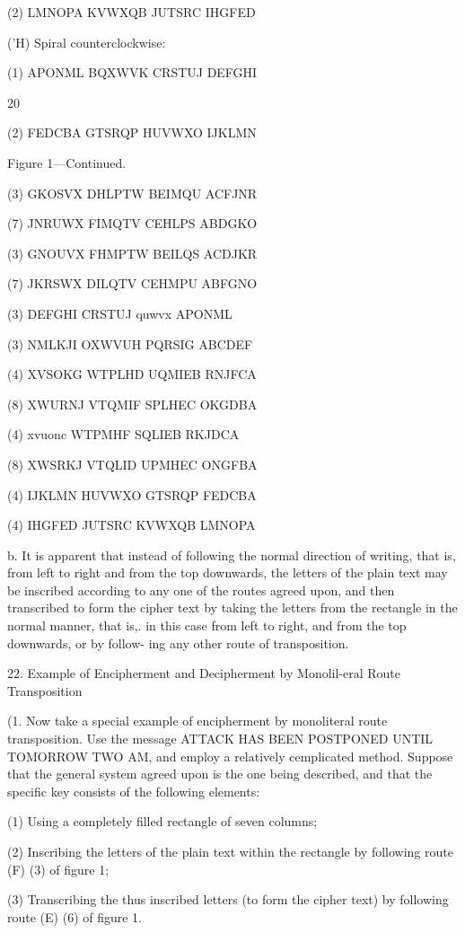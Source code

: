 (2)
LMNOPA
KVWXQB
JUTSRC
IHGFED

('H) Spiral counterclockwise:

(1)
APONML
BQXWVK
CRSTUJ
DEFGHI

20

(2)
FEDCBA
GTSRQP
HUVWXO
IJKLMN

Figure 1—Continued.

(3)
GKOSVX
DHLPTW
BEIMQU
ACFJNR

(7)
JNRUWX
FIMQTV
CEHLPS
ABDGKO

(3)
GNOUVX
FHMPTW
BEILQS
ACDJKR

(7)
JKRSWX
DILQTV
CEHMPU
ABFGNO

(3)
DEFGHI
CRSTUJ
quwvx
APONML

(3)
NMLKJI
OXWVUH
PQRSIG
ABCDEF

(4)
XVSOKG
WTPLHD
UQMIEB
RNJFCA

(8)
XWURNJ
VTQMIF
SPLHEC
OKGDBA

(4)
xvuonc
WTPMHF
SQLIEB
RKJDCA

(8)
XWSRKJ
VTQLID
UPMHEC
ONGFBA

(4)
IJKLMN
HUVWXO
GTSRQP
FEDCBA

(4)
IHGFED
JUTSRC
KVWXQB
LMNOPA

 


b. It is apparent that instead of following the normal direction of
writing, that is, from left to right and from the top downwards, the
letters of the plain text may be inscribed according to any one of the
routes agreed upon, and then transcribed to form the cipher text by
taking the letters from the rectangle in the normal manner, that is,. in
this case from left to right, and from the top downwards, or by follow-
ing any other route of transposition.

22. Example of Encipherment and Decipherment by Monolil-eral
Route Transposition

(1. Now take a special example of encipherment by monoliteral route
transposition. Use the message ATTACK HAS BEEN POSTPONED
UNTIL TOMORROW TWO AM, and employ a relatively cemplicated
method. Suppose that the general system agreed upon is the one being
described, and that the speciﬁc key consists of the following elements:

(1) Using a completely ﬁlled rectangle of seven columns;

(2) Inscribing the letters of the plain text within the rectangle by
following route (F) (3) of ﬁgure 1;

(3) Transcribing the thus inscribed letters (to form the cipher text)
by following route (E) (6) of ﬁgure 1.

